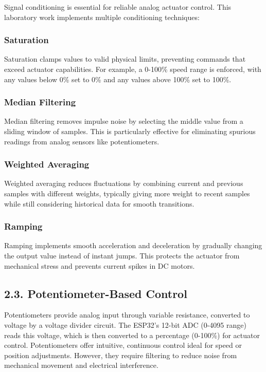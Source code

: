 \documentclass[12pt]{article}
\begin{document}
Signal conditioning is essential for reliable analog actuator control. This laboratory work implements multiple conditioning techniques:

\subsubsection*{Saturation}

Saturation clamps values to valid physical limits, preventing commands that exceed actuator capabilities. For example, a 0-100\% speed range is enforced, with any values below 0\% set to 0\% and any values above 100\% set to 100\%.

\subsubsection*{Median Filtering}

Median filtering removes impulse noise by selecting the middle value from a sliding window of samples. This is particularly effective for eliminating spurious readings from analog sensors like potentiometers.

\subsubsection*{Weighted Averaging}

Weighted averaging reduces fluctuations by combining current and previous samples with different weights, typically giving more weight to recent samples while still considering historical data for smooth transitions.

\subsubsection*{Ramping}

Ramping implements smooth acceleration and deceleration by gradually changing the output value instead of instant jumps. This protects the actuator from mechanical stress and prevents current spikes in DC motors.

\subsection*{2.3. Potentiometer-Based Control}

Potentiometers provide analog input through variable resistance, converted to voltage by a voltage divider circuit. The ESP32's 12-bit ADC (0-4095 range) reads this voltage, which is then converted to a percentage (0-100\%) for actuator control. Potentiometers offer intuitive, continuous control ideal for speed or position adjustments. However, they require filtering to reduce noise from mechanical movement and electrical interference.
\end{document}
